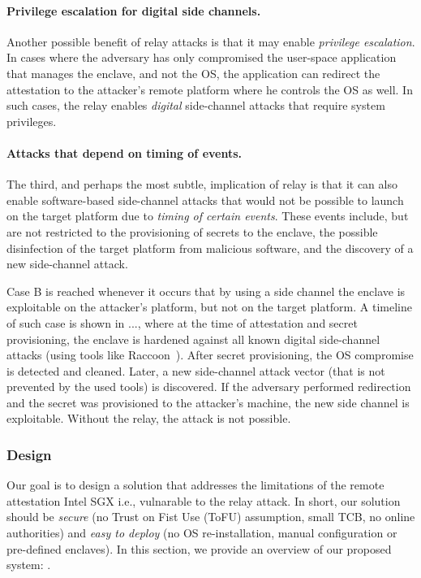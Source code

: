 \paragraph{Privilege escalation for digital side channels.}
Another possible benefit of relay attacks is that it may enable \emph{privilege escalation}. In cases where the adversary has only compromised the user-space application that manages the enclave, and not the OS, the application can redirect the attestation to the attacker's remote platform where he controls the OS as well. In such cases, the relay enables \emph{digital} side-channel attacks that require system privileges.


\paragraph{Attacks that depend on timing of events.}    
The third, and perhaps the most subtle, implication of relay is that it can also enable software-based side-channel attacks that would not be possible to launch on the target platform due to \emph{timing of certain events}. These events include, but are not restricted to the provisioning of secrets to the enclave, the possible disinfection of the target platform from malicious software, and the discovery of a new side-channel attack. 

Case B is reached whenever it occurs that by using a side channel the enclave is exploitable on the attacker's platform, but not on the target platform. 
    A timeline of such case is shown in ..., where at the time of attestation and secret provisioning, the enclave is hardened against all known digital side-channel attacks (using tools like Raccoon~\cite{raccoon}). After secret provisioning, the OS compromise is detected and cleaned. Later, a new side-channel attack vector (that is not prevented by the used tools) is discovered. If the adversary performed redirection and the secret was provisioned to the attacker's machine, the new side channel is exploitable. Without the relay, the attack is not possible.


\subsubsection*{\namepm Design}

Our goal is to design a solution that addresses the limitations of the remote attestation Intel SGX i.e., vulnarable to the relay attack. In short, our solution should be \emph{secure} (no Trust on Fist Use (ToFU) assumption, small TCB, no online authorities) and \emph{easy to deploy} (no OS re-installation, manual configuration or pre-defined enclaves). In this section, we provide an overview of our proposed system: \namepm.

